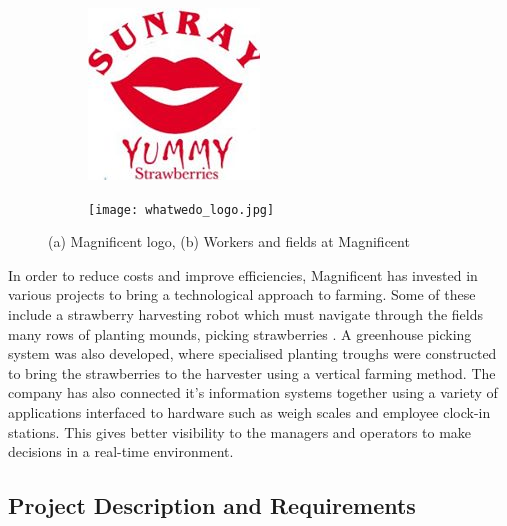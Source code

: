 \documentclass[fleqn,twoside]{article}
\begin{document}
\begin{figure}[h]
	\centering
	\begin{subfigure}{.4\textwidth}
		\centering
		\includegraphics[width=.6\linewidth]{sunray.jpg}
		\caption{}
		\label{fig:sunray}
	\end{subfigure}%
	\begin{subfigure}{.6\textwidth}
		\centering
		\texttt{[image: whatwedo\_logo.jpg]}
		\caption{}
		\label{fig:whatwedo}
	\end{subfigure}%
	\caption{(a) Magnificent logo, (b) Workers and fields at Magnificent}
	\label{fig:test}
\end{figure}

In order to reduce costs and improve efficiencies, Magnificent has invested in various projects to bring a technological approach to farming. Some of these include a strawberry harvesting robot which must navigate through the fields many rows of planting mounds, picking strawberries \cite{busch}. A greenhouse picking system was also developed, where specialised planting troughs were constructed to bring the strawberries to the harvester using a vertical farming method. The company has also connected it's information systems together using a variety of applications interfaced to hardware such as weigh scales and employee clock-in stations. This gives better visibility to the managers and operators to make decisions in a real-time environment. 




\subsection{Project Description and Requirements}
\end{document}
